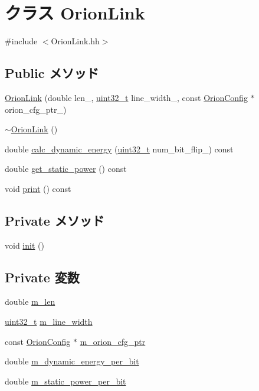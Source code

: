 \hypertarget{classOrionLink}{
\section{クラス OrionLink}
\label{classOrionLink}
}


{\ttfamily \#include $<$OrionLink.hh$>$}\subsection*{Public メソッド}
\begin{DoxyCompactItemize}
\item 
\hyperlink{classOrionLink_a738d02ecde920757987fe6bd52224727}{OrionLink} (double len\_\-, \hyperlink{Type_8hh_a435d1572bf3f880d55459d9805097f62}{uint32\_\-t} line\_\-width\_\-, const \hyperlink{classOrionConfig}{OrionConfig} $\ast$orion\_\-cfg\_\-ptr\_\-)
\item 
\hyperlink{classOrionLink_a9250d37b77d0ac7ef2389b92d534f00c}{$\sim$OrionLink} ()
\item 
double \hyperlink{classOrionLink_a61117a7f4f0cd1bb452941c9d4156db2}{calc\_\-dynamic\_\-energy} (\hyperlink{Type_8hh_a435d1572bf3f880d55459d9805097f62}{uint32\_\-t} num\_\-bit\_\-flip\_\-) const 
\item 
double \hyperlink{classOrionLink_aeb5933543cfdeb1668baed5ce7c68351}{get\_\-static\_\-power} () const 
\item 
void \hyperlink{classOrionLink_a3a3ab31c19c38fe926198ddc4a0a4a91}{print} () const 
\end{DoxyCompactItemize}
\subsection*{Private メソッド}
\begin{DoxyCompactItemize}
\item 
void \hyperlink{classOrionLink_a02fd73d861ef2e4aabb38c0c9ff82947}{init} ()
\end{DoxyCompactItemize}
\subsection*{Private 変数}
\begin{DoxyCompactItemize}
\item 
double \hyperlink{classOrionLink_a33df3a90750eb311de09e793d9aaa294}{m\_\-len}
\item 
\hyperlink{Type_8hh_a435d1572bf3f880d55459d9805097f62}{uint32\_\-t} \hyperlink{classOrionLink_add4c54b54475120d0e1547d3a9c48f44}{m\_\-line\_\-width}
\item 
const \hyperlink{classOrionConfig}{OrionConfig} $\ast$ \hyperlink{classOrionLink_a84de60ae1f7ca812df5347e27a658c77}{m\_\-orion\_\-cfg\_\-ptr}
\item 
double \hyperlink{classOrionLink_a8fee722d1b0994db54aa86ad00575a3d}{m\_\-dynamic\_\-energy\_\-per\_\-bit}
\item 
double \hyperlink{classOrionLink_ab1cb4b65354566ca31a15d28286fb9c7}{m\_\-static\_\-power\_\-per\_\-bit}
\end{DoxyCompactItemize}


